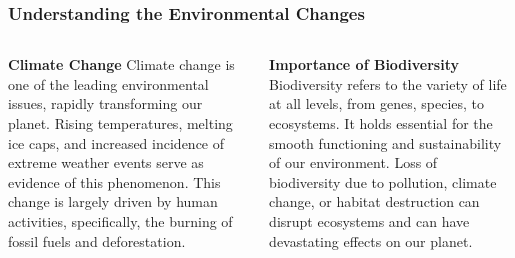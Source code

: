 \documentclass[5pt]{beamer}
\begin{document}
\begin{frame}
\frametitle{Understanding the Environmental Changes}
\begin{columns}
\begin{column}{0.45\textwidth}
\begin{block}{\textbf{Climate Change}}
Climate change is one of the leading environmental issues, rapidly transforming our planet. Rising temperatures, melting ice caps, and increased incidence of extreme weather events serve as evidence of this phenomenon. This change is largely driven by human activities, specifically, the burning of fossil fuels and deforestation.
\end{block}
\end{column}
\begin{column}{0.45\textwidth}
\begin{block}{\textbf{Importance of Biodiversity}}
Biodiversity refers to the variety of life at all levels, from genes, species, to ecosystems. It holds essential for the smooth functioning and sustainability of our environment. Loss of biodiversity due to pollution, climate change, or habitat destruction can disrupt ecosystems and can have devastating effects on our planet.
\end{block}
\end{column}
\end{columns}
\end{frame}
\end{document}
